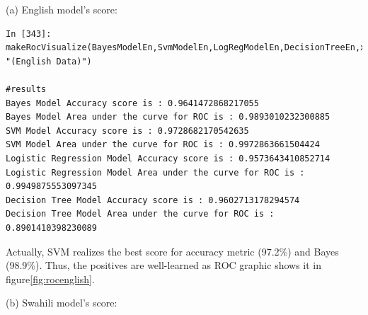 \documentclass[12pt,a4paper, oneside]{book}
\begin{document}
(a) English model's score: 
\begin{lstlisting}[style=stylejupyter]
In [343]: makeRocVisualize(BayesModelEn,SvmModelEn,LogRegModelEn,DecisionTreeEn,x_test_features_en,y_test_en, "(English Data)")

#results 
Bayes Model Accuracy score is : 0.9641472868217055
Bayes Model Area under the curve for ROC is : 0.9893010232300885
SVM Model Accuracy score is : 0.9728682170542635
SVM Model Area under the curve for ROC is : 0.9972863661504424
Logistic Regression Model Accuracy score is : 0.9573643410852714
Logistic Regression Model Area under the curve for ROC is : 0.9949875553097345
Decision Tree Model Accuracy score is : 0.9602713178294574
Decision Tree Model Area under the curve for ROC is : 0.8901410398230089
\end{lstlisting} 
Actually, SVM realizes the best score for accuracy metric (97.2\%) and Bayes (98.9\%). Thus, the positives are well-learned as ROC graphic shows it in figure\ref{fig:rocenglish}.

(b) Swahili model's score:
\end{document}
